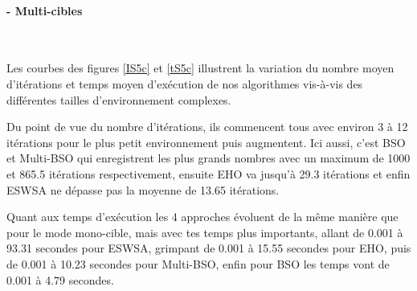 	
	\noindent
	\paragraph{- Multi-cibles}
	\textbf{ }\\
	\vspace{-0.2cm}
	
	Les courbes des figures \ref{IS5c} et \ref{tS5c} illustrent la variation du nombre moyen d'itérations et temps moyen d'exécution de nos algorithmes vis-à-vis des différentes tailles d'environnement complexes.\\
	\vspace{-0.2cm}
	
	Du point de vue du nombre d'itérations, ils commencent tous avec environ 3 à 12 itérations pour le plus petit environnement puis augmentent. Ici aussi, c'est BSO et Multi-BSO qui enregistrent les plus grands nombres avec un maximum de 1000 et 865.5 itérations respectivement, ensuite EHO va jusqu'à 29.3 itérations et enfin ESWSA ne dépasse pas la moyenne de 13.65 itérations.\\
	\vspace{-0.2cm}
	
	Quant aux temps d'exécution les 4 approches évoluent de la même manière que pour le mode mono-cible, mais avec tes temps plus importants, allant de 0.001 à 93.31 secondes pour ESWSA, grimpant de 0.001 à 15.55 secondes pour EHO, puis de 0.001 à 10.23 secondes pour Multi-BSO, enfin pour BSO les temps vont de 0.001 à 4.79 secondes.
	
	
	
	\noindent	
	\hspace{-0.5cm}
	\begin{minipage}[t]{0.55\textwidth}
		\captionsetup{width=0.8\linewidth}
		\centering{}
		\vspace{-0.3cm}
		\label{IS5c}
	\end{minipage}\hfill
	\begin{minipage}[t]{0.55\textwidth}
		\captionsetup{width=0.8\linewidth}
		\centering{}
		\vspace{-0.3cm}
		\label{tS5c}
	\end{minipage}\hfill
	
